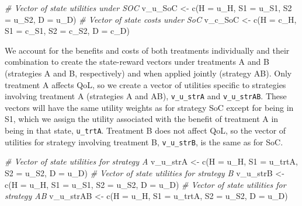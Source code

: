 \documentclass[
]{article}
\newenvironment{Shaded}{\begin{snugshade}}{\end{snugshade}}
\newcommand{\AttributeTok}[1]{\textcolor[rgb]{0.77,0.63,0.00}{#1}}
\newcommand{\CommentTok}[1]{\textcolor[rgb]{0.56,0.35,0.01}{\textit{#1}}}
\newcommand{\FunctionTok}[1]{\textcolor[rgb]{0.00,0.00,0.00}{#1}}
\newcommand{\NormalTok}[1]{#1}
\newcommand{\OtherTok}[1]{\textcolor[rgb]{0.56,0.35,0.01}{#1}}
\begin{document}
\begin{Shaded}
\begin{Highlighting}[]
\CommentTok{\# Vector of state utilities under SOC}
\NormalTok{v\_u\_SoC }\OtherTok{\textless{}{-}} \FunctionTok{c}\NormalTok{(}\AttributeTok{H =}\NormalTok{ u\_H, }\AttributeTok{S1 =}\NormalTok{ u\_S1, }\AttributeTok{S2 =}\NormalTok{ u\_S2, }\AttributeTok{D =}\NormalTok{ u\_D)}
\CommentTok{\# Vector of state costs under SoC}
\NormalTok{v\_c\_SoC }\OtherTok{\textless{}{-}} \FunctionTok{c}\NormalTok{(}\AttributeTok{H =}\NormalTok{ c\_H, }\AttributeTok{S1 =}\NormalTok{ c\_S1, }\AttributeTok{S2 =}\NormalTok{ c\_S2, }\AttributeTok{D =}\NormalTok{ c\_D)}
\end{Highlighting}
\end{Shaded}

We account for the benefits and costs of both treatments individually and their combination to create the state-reward vectors under treatments A and B (strategies A and B, respectively) and when applied jointly (strategy AB). Only treatment A affects QoL, so we create a vector of utilities
specific to strategies involving treatment A (strategies A and AB), \texttt{v\_u\_strA} and \texttt{v\_u\_strAB}. These vectors will have the same utility weights as for strategy SoC except for being in S1, which we assign the utility associated with the benefit of treatment A in being in that state, \texttt{u\_trtA}. Treatment B does not affect QoL, so the vector of utilities for strategy involving treatment B, \texttt{v\_u\_strB}, is the same as for SoC.

\begin{Shaded}
\begin{Highlighting}[]
\CommentTok{\# Vector of state utilities for strategy A}
\NormalTok{v\_u\_strA }\OtherTok{\textless{}{-}} \FunctionTok{c}\NormalTok{(}\AttributeTok{H =}\NormalTok{ u\_H, }\AttributeTok{S1 =}\NormalTok{ u\_trtA, }\AttributeTok{S2 =}\NormalTok{ u\_S2, }\AttributeTok{D =}\NormalTok{ u\_D)}
\CommentTok{\# Vector of state utilities for strategy B}
\NormalTok{v\_u\_strB }\OtherTok{\textless{}{-}} \FunctionTok{c}\NormalTok{(}\AttributeTok{H =}\NormalTok{ u\_H, }\AttributeTok{S1 =}\NormalTok{ u\_S1, }\AttributeTok{S2 =}\NormalTok{ u\_S2, }\AttributeTok{D =}\NormalTok{ u\_D)}
\CommentTok{\# Vector of state utilities for strategy AB}
\NormalTok{v\_u\_strAB }\OtherTok{\textless{}{-}} \FunctionTok{c}\NormalTok{(}\AttributeTok{H =}\NormalTok{ u\_H, }\AttributeTok{S1 =}\NormalTok{ u\_trtA, }\AttributeTok{S2 =}\NormalTok{ u\_S2, }\AttributeTok{D =}\NormalTok{ u\_D)}
\end{Highlighting}
\end{Shaded}
\end{document}
